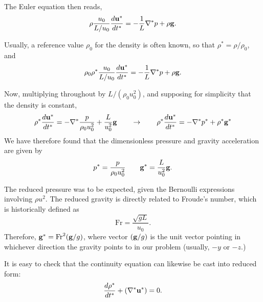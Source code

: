 The Euler equation then reads,
\[
\rho \frac{u_0}{L/u_0} \frac{d\mathbf{u}^* }{dt^* } =
- \frac{ 1 }{ L } \nabla^* p 
+ \rho \mathbf{g} .
\]

Usually, a reference value $\rho_0$ for the density is often known, so
that $\rho^* = \rho / \rho_0$, and
\[
\rho_0 \rho^* \frac{u_0}{L/u_0} \frac{d\mathbf{u}^* }{dt^* } =
- \frac{ 1 }{ L } \nabla^* p 
+ \rho \mathbf{g} .
\]


Now, multiplying throughout by $L/(\rho_0 u_0^2)$, and supposing for simplicity
that the density is constant,
\begin{equation}
  \label{eq:Euler_just_before_adim}
\rho^*
\frac{d\mathbf{u}^* }{dt^* } =
-  \nabla^* \frac{ p }{ \rho_0 u_0^2 } 
+  \frac{ L }{ u_0^2 } \mathbf{g} \qquad \to \qquad
\rho^* \frac{d\mathbf{u}^* }{dt^* } =
-  \nabla^* p^*
+  \rho^* \mathbf{g}^* 
\end{equation}
We have therefore found that the dimensionless pressure and gravity
acceleration are given by
\[
p^*= \frac{ p }{ \rho_0 u_0^2 } \qquad
\mathbf{g}^* = \frac{ L }{ u_0^2 } \mathbf{g} .
\]

The reduced pressure was to be expected, given the Bernoulli
expressions involving $\rho u^2$. The reduced gravity is directly
related to Froude's number, which is historically defined as
\[
\mathrm{Fr}=\frac{ \sqrt{gL}}{u_0}.
\]
Therefore, $ \mathbf{g}^* = \mathrm{Fr}^2 (\mathbf{g}/g) $, where vector $(\mathbf{g}/g)
$ is the unit vector pointing in whichever direction the gravity
points to in our problem (usually, $-y$ or $-z$.)


It is easy to check that the continuity equation can likewise be
cast into reduced form:
\[
\frac{d\rho^* }{dt^* }+
 ( \nabla^* \mathbf{u}^*) = 0 .
\]

